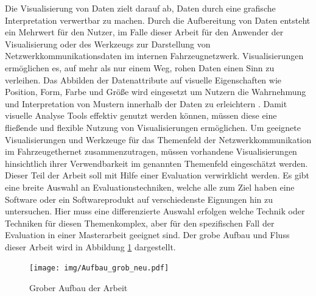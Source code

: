\documentclass[draft=false
              ,paper=a4
              ,twoside=false
              ,fontsize=11pt
              ,headsepline
              ,BCOR10mm
              ,DIV11
              ]{scrbook}
\newcommand{\TODO}[1]{\colorbox{yellow}{\textcolor{red}{[TODO: #1]}}}
\begin{document}
Die Visualisierung von Daten zielt darauf ab, Daten durch eine grafische Interpretation verwertbar zu machen. Durch die Aufbereitung von Daten entsteht ein Mehrwert für den Nutzer, im Falle dieser Arbeit für den Anwender der Visualisierung oder des Werkzeugs zur Darstellung von Netzwerkkommunikationsdaten im internen Fahrzeugnetzwerk. Visualisierungen ermöglichen es, auf mehr als nur einem Weg, rohen Daten einen Sinn zu verleihen. Das Abbilden der Datenattribute auf visuelle Eigenschaften wie Position, Form, Farbe und Größe wird eingesetzt um Nutzern die Wahrnehmung und Interpretation von Mustern innerhalb der Daten zu erleichtern \cite{shneiderman_designing_2005}. Damit visuelle Analyse Tools effektiv genutzt werden können, müssen diese eine fließende und flexible Nutzung von Visualisierungen ermöglichen. 
%
Um geeignete Visualisierungen und Werkzeuge für das Themenfeld der Netzwerkkommunikation im Fahrzeugethernet zusammenzutragen, müssen vorhandene Visualisierungen hinsichtlich ihrer Verwendbarkeit im genannten Themenfeld eingeschätzt werden. Dieser Teil der Arbeit soll mit Hilfe einer Evaluation verwirklicht werden. Es gibt eine breite Auswahl an Evaluationstechniken, welche alle zum Ziel haben eine Software oder ein Softwareprodukt auf verschiedenste Eignungen hin zu untersuchen. Hier muss eine differenzierte Auswahl erfolgen welche Technik oder Techniken für diesen Themenkomplex, aber für den spezifischen Fall der Evaluation in einer Masterarbeit geeignet sind. Der grobe Aufbau und Fluss dieser Arbeit wird in Abbildung \ref{fig:aufbaugrob} dargestellt. 

\begin{figure}[htbp]
  \centering
  \texttt{[image: img/Aufbau\_grob\_neu.pdf]}
  \caption{Grober Aufbau der Arbeit}
  \label{fig:aufbaugrob}
\end{figure}
\end{document}
